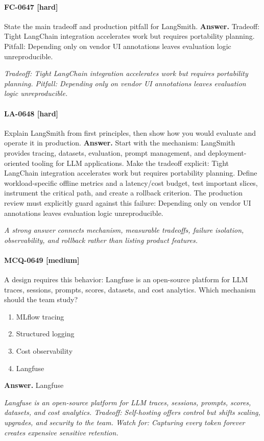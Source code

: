 \paragraph{FC-0647 [hard]} State the main tradeoff and production pitfall for LangSmith.
\noindent\textbf{Answer.} Tradeoff: Tight LangChain integration accelerates work but requires portability planning. Pitfall: Depending only on vendor UI annotations leaves evaluation logic unreproducible.
\par\textit{Tradeoff: Tight LangChain integration accelerates work but requires portability planning. Pitfall: Depending only on vendor UI annotations leaves evaluation logic unreproducible.}
\paragraph{LA-0648 [hard]} Explain LangSmith from first principles, then show how you would evaluate and operate it in production.
\noindent\textbf{Answer.} Start with the mechanism: LangSmith provides tracing, datasets, evaluation, prompt management, and deployment-oriented tooling for LLM applications. Make the tradeoff explicit: Tight LangChain integration accelerates work but requires portability planning. Define workload-specific offline metrics and a latency/cost budget, test important slices, instrument the critical path, and create a rollback criterion. The production review must explicitly guard against this failure: Depending only on vendor UI annotations leaves evaluation logic unreproducible.
\par\textit{A strong answer connects mechanism, measurable tradeoffs, failure isolation, observability, and rollback rather than listing product features.}
\paragraph{MCQ-0649 [medium]} A design requires this behavior: Langfuse is an open-source platform for LLM traces, sessions, prompts, scores, datasets, and cost analytics. Which mechanism should the team study?
\begin{enumerate}[label=\Alph*.]
\item MLflow tracing
\item Structured logging
\item Cost observability
\item Langfuse
\end{enumerate}
\noindent\textbf{Answer.} Langfuse
\par\textit{Langfuse is an open-source platform for LLM traces, sessions, prompts, scores, datasets, and cost analytics. Tradeoff: Self-hosting offers control but shifts scaling, upgrades, and security to the team. Watch for: Capturing every token forever creates expensive sensitive retention.}
